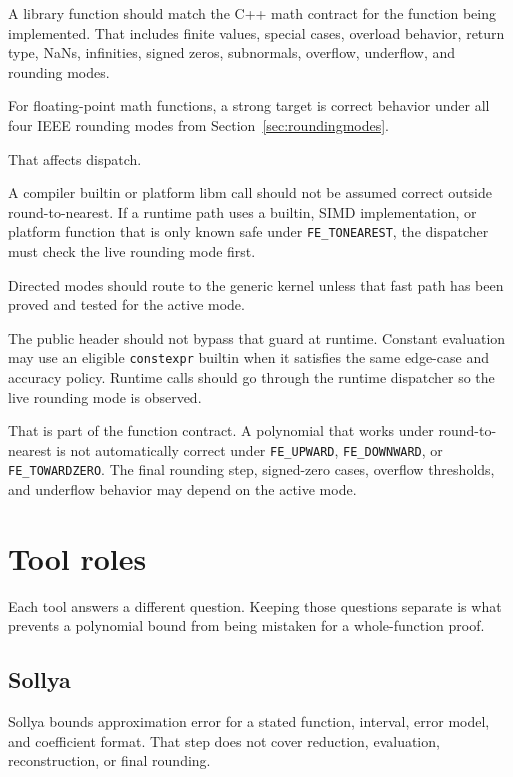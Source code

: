 \documentclass[manuscript, nonacm]{acmart}
\begin{document}
    A library function should match the C++ math contract for the function being
    implemented. That includes finite values, special cases, overload behavior,
    return type, NaNs, infinities, signed zeros, subnormals, overflow, underflow,
    and rounding modes.

    For floating-point math functions, a strong target is correct behavior under
    all four IEEE rounding modes from Section~\ref{sec:roundingmodes}.

    That affects dispatch.

    A compiler builtin or platform libm call should not be assumed correct
    outside round-to-nearest. If a runtime path uses a builtin, SIMD
    implementation, or platform function that is only known safe under
    \texttt{FE\_TONEAREST}, the dispatcher must check the live rounding mode
    first.

    Directed modes should route to the generic kernel unless that fast path has
    been proved and tested for the active mode.

    The public header should not bypass that guard at runtime. Constant evaluation
    may use an eligible \texttt{constexpr} builtin when it satisfies the same
    edge-case and accuracy policy. Runtime calls should go through the runtime
    dispatcher so the live rounding mode is observed.

    That is part of the function contract. A polynomial that works under
    round-to-nearest is not automatically correct under \texttt{FE\_UPWARD},
    \texttt{FE\_DOWNWARD}, or \texttt{FE\_TOWARDZERO}. The final rounding step,
    signed-zero cases, overflow thresholds, and underflow behavior may depend on
    the active mode.



    \section{Tool roles}

    Each tool answers a different question. Keeping those questions separate is
    what prevents a polynomial bound from being mistaken for a whole-function
    proof.

    \subsection{Sollya}

    Sollya bounds approximation error for a stated function, interval, error model,
    and coefficient format. That step does not cover reduction, evaluation,
    reconstruction, or final rounding.
\end{document}
